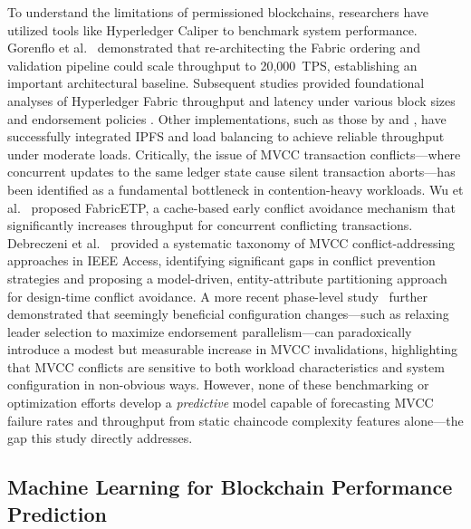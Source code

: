 \documentclass[manuscript,screen,nofonts]{acmart}
\begin{document}
To understand the limitations of permissioned blockchains, researchers have utilized tools like Hyperledger Caliper to benchmark system performance. Gorenflo et al.~\citep{gorenflo_fastfabric_2019} demonstrated that re-architecting the Fabric ordering and validation pipeline could scale throughput to 20,000~TPS, establishing an important architectural baseline. Subsequent studies provided foundational analyses of Hyperledger Fabric throughput and latency under various block sizes and endorsement policies \citep{thakkar_performance_2018,el_hajji_optimization_2024}. Other implementations, such as those by \cite{kumar_integrating_2026} and \cite{kaushal_convergence_2025}, have successfully integrated IPFS and load balancing to achieve reliable throughput under moderate loads. Critically, the issue of MVCC transaction conflicts---where concurrent updates to the same ledger state cause silent transaction aborts---has been identified as a fundamental bottleneck in contention-heavy workloads. Wu et al.~\citep{wu_fabricetp_2023} proposed FabricETP, a cache-based early conflict avoidance mechanism that significantly increases throughput for concurrent conflicting transactions. Debreczeni et al.~\citep{debreczeni_transaction_2024} provided a systematic taxonomy of MVCC conflict-addressing approaches in IEEE Access, identifying significant gaps in conflict prevention strategies and proposing a model-driven, entity-attribute partitioning approach for design-time conflict avoidance. A more recent phase-level study~\citep{gorenflo_endtoend_2026} further demonstrated that seemingly beneficial configuration changes---such as relaxing leader selection to maximize endorsement parallelism---can paradoxically introduce a modest but measurable increase in MVCC invalidations, highlighting that MVCC conflicts are sensitive to both workload characteristics and system configuration in non-obvious ways. However, none of these benchmarking or optimization efforts develop a \textit{predictive} model capable of forecasting MVCC failure rates and throughput from static chaincode complexity features alone---the gap this study directly addresses.

\subsection{Machine Learning for Blockchain Performance Prediction}
\end{document}
